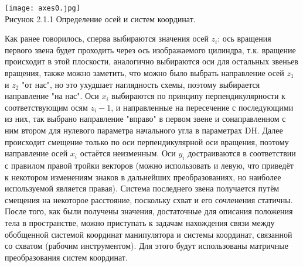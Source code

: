 \begin{center}
    \texttt{[image: axes0.jpg]}\\
    Рисунок 2.1.1 Определение осей и систем координат.
\end{center}

\hspace*{\parindent}Как ранее говорилось, сперва выбираются значения осей $z_i$: ось вращения первого звена будет проходить через ось изображаемого цилиндра, т.к. вращение происходит в этой плоскости, аналогично выбираются оси для остальных звеньев вращения, также можно заметить, что можно было выбрать направление осей $z_1$ и $z_2$ "от нас", но это  ухудшает наглядность схемы, поэтому выбирается направление "на нас". Оси $x_i$ выбираются по принципу перпендикулярности к соответствующим осям $z_i-1$, и направленные на пересечение с последующими из них, так выбрано направление "вправо" в первом звене и сонаправленном с ним втором для нулевого параметра начального угла в параметрах DH. Далее происходит смещение только по оси перпендикулярной оси вращения, поэтому направление осей $x_i$ остаётся неизменным. Оси $y_i$ достраиваются в соответствии с правилом правой тройки векторов (можно использовать и левую, что приведёт к некотором изменениям знаков в дальнейших преобразованиях, но наиболее используемой является правая). Система последнего звена получается путём смещения на некоторое расстояние, поскольку схват и его сочленения статичны.\\
\hspace*{\parindent}После того, как были получены значения, достаточные для описания положения тела в пространстве, можно приступать к задачам нахождения связи между обобщенной системой координат манипулятора и системы координат, связанной со схватом (рабочим инструментом). Для этого будут использованы матричные преобразования систем координат.\\

